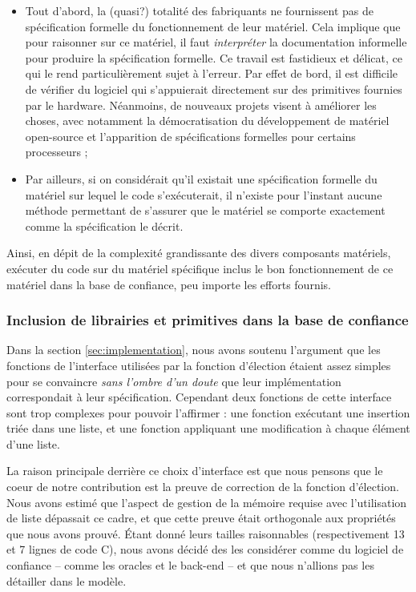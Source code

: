 \begin{itemize}
	\item Tout d'abord, la (quasi?) totalité des fabriquants ne fournissent pas de spécification formelle du fonctionnement de leur matériel. Cela implique que pour raisonner sur ce matériel, il faut \emph{interpréter} la documentation informelle pour produire la spécification formelle. Ce travail est fastidieux et délicat, ce qui le rend particulièrement sujet à l'erreur. Par effet de bord, il est difficile de vérifier du logiciel qui s'appuierait directement sur des primitives fournies par le hardware. Néanmoins, de nouveaux projets visent à améliorer les choses, avec notamment la démocratisation du développement de matériel open-source et l'apparition de spécifications formelles pour certains processeurs \cite{reid2017guards} ;
	\item Par ailleurs, si on considérait qu'il existait une spécification formelle du matériel sur lequel le code s'exécuterait, il n'existe pour l'instant aucune méthode permettant de s'assurer que le matériel se comporte exactement comme la spécification le décrit.
\end{itemize}

Ainsi, en dépit de la complexité grandissante des divers composants matériels, exécuter du code sur du matériel spécifique inclus le bon fonctionnement de ce matériel dans la base de confiance, peu importe les efforts fournis.

\subsubsection{Inclusion de librairies et primitives dans la base de confiance}

Dans la section \ref{sec:implementation}, nous avons soutenu l'argument que les fonctions de l'interface utilisées par la fonction d'élection étaient assez simples pour se convaincre \emph{sans l'ombre d'un doute} que leur implémentation correspondait à leur spécification. Cependant deux fonctions de cette interface sont trop complexes pour pouvoir l'affirmer : une fonction exécutant une insertion triée dans une liste, et une fonction appliquant une modification à chaque élément d'une liste.

La raison principale derrière ce choix d'interface est que nous pensons que le coeur de notre contribution est la preuve de correction de la fonction d'élection. Nous avons estimé que l'aspect de gestion de la mémoire requise avec l'utilisation de liste dépassait ce cadre, et que cette preuve était orthogonale aux propriétés que nous avons prouvé. Étant donné leurs tailles raisonnables (respectivement 13 et 7 lignes de code C), nous avons décidé des les considérer comme du logiciel de confiance -- comme les oracles et le back-end -- et que nous n'allions pas les détailler dans le modèle.


